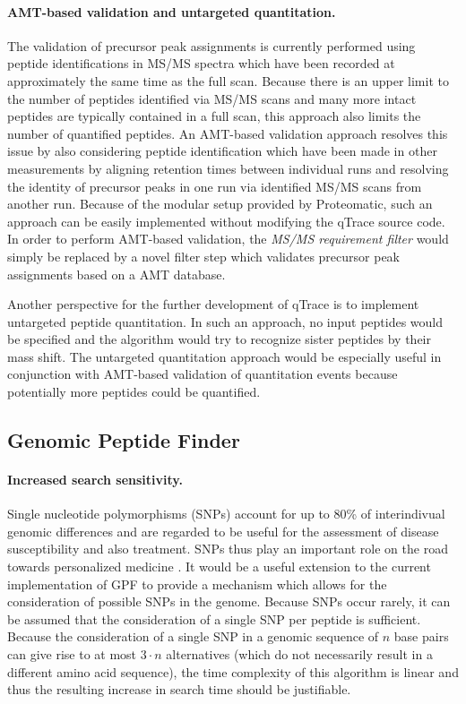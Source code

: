 \paragraph{AMT-based validation and untargeted quantitation.}

The validation of precursor peak assignments is currently performed using
peptide identifications in MS/MS spectra which have been recorded at 
approximately the same time as the full scan.
Because there is an upper limit to the number of peptides identified via MS/MS
scans and many more intact peptides are typically contained in a full scan,
this approach also limits the number of quantified peptides.
An AMT-based validation approach \citep{Mueller2007} resolves this issue by
also considering peptide identification which have been made in other 
measurements by aligning retention times between individual runs and 
resolving the identity of precursor peaks in one run via identified MS/MS scans
from another run.
Because of the modular setup provided by Proteomatic, such an approach can
be easily implemented without modifying the qTrace source code.
In order to perform AMT-based validation, the {\em MS/MS requirement filter}
would simply be replaced by a novel filter step which validates precursor
peak assignments based on a AMT database.

Another perspective for the further development of qTrace is to implement
untargeted peptide quantitation. 
In such an approach, no input peptides would be specified and the algorithm
would try to recognize sister peptides by their mass shift.
The untargeted quantitation approach would be especially useful in conjunction
with AMT-based validation of quantitation events because potentially more 
peptides could be quantified.

\subsection{Genomic Peptide Finder}

\paragraph{Increased search sensitivity.}

Single nucleotide polymorphisms (SNPs) account for up to 80\% of interindivual
genomic differences and are regarded to be useful for the assessment of disease
susceptibility and also treatment.
SNPs thus play an important role on the road towards personalized medicine 
\citep{Carlson2008}.
It would be a useful extension to the current implementation of GPF to provide 
a mechanism which allows for the consideration of possible SNPs in the genome.
Because SNPs occur rarely, it can be assumed that the consideration of a single
SNP per peptide is sufficient.
Because the consideration of a single SNP in a genomic sequence of $n$ base pairs
can give rise to at most $3 \cdot n$ alternatives (which do not necessarily
result in a different amino acid sequence), the time complexity of this algorithm
is linear and thus the resulting increase in search time should be justifiable.
